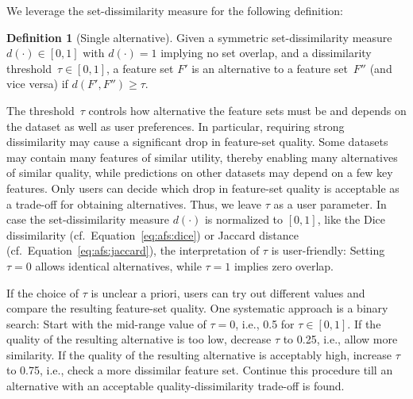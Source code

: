 \documentclass{article}
\theoremstyle{definition}
\newtheorem{definition}{Definition}
\begin{document}
We leverage the set-dissimilarity measure for the following definition:
%
\begin{definition}[Single alternative]
	Given a symmetric set-dissimilarity measure~$d(\cdot) \in [0, 1]$ with $d(\cdot) = 1$ implying no set overlap, and a dissimilarity threshold~$\tau \in [0, 1]$, a feature set $F'$ is an alternative to a feature set~$F''$ (and vice versa) if $d(F',F'') \geq \tau$.
	\label{def:afs:single-alternative}
\end{definition}
%
The threshold~$\tau$ controls how alternative the feature sets must be and depends on the dataset as well as user preferences.
In particular, requiring strong dissimilarity may cause a significant drop in feature-set quality.
Some datasets may contain many features of similar utility, thereby enabling many alternatives of similar quality, while predictions on other datasets may depend on a few key features.
Only users can decide which drop in feature-set quality is acceptable as a trade-off for obtaining alternatives.
Thus, we leave $\tau$ as a user parameter.
In case the set-dissimilarity measure $d(\cdot)$ is normalized to $[0,1]$, like the Dice dissimilarity (cf.~Equation~\ref{eq:afs:dice}) or Jaccard distance (cf.~Equation~\ref{eq:afs:jaccard}), the interpretation of $\tau$ is user-friendly:
Setting $\tau=0$ allows identical alternatives, while $\tau=1$ implies zero overlap.

If the choice of $\tau$ is unclear a priori, users can try out different values and compare the resulting feature-set quality.
One systematic approach is a binary search:
Start with the mid-range value of $\tau=0$, i.e., 0.5 for $\tau \in [0,1]$.
If the quality of the resulting alternative is too low, decrease $\tau$ to 0.25, i.e., allow more similarity.
If the quality of the resulting alternative is acceptably high, increase $\tau$ to 0.75, i.e., check a more dissimilar feature set.
Continue this procedure till an alternative with an acceptable quality-dissimilarity trade-off is found.
\end{document}
